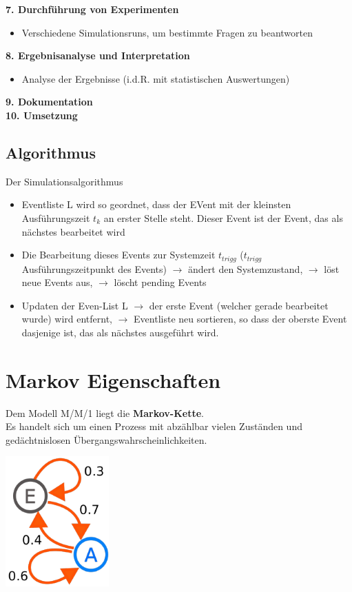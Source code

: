 \documentclass{report}
\newenvironment{Figure}
	{\par\medskip\noindent\minipage{\linewidth}}
	{\endminipage\par\medskip}
\theoremstyle{definition}
\theoremstyle{example}
\begin{document}
\textbf{7. Durchführung von Experimenten}
\begin{itemize}
   \item Verschiedene Simulationsruns, um bestimmte Fragen zu beantworten
\end{itemize}

\textbf{8. Ergebnisanalyse und Interpretation}
\begin{itemize}
   \item Analyse der Ergebnisse (i.d.R. mit statistischen Auswertungen)
\end{itemize}

\textbf{9. Dokumentation}\\
\textbf{10. Umsetzung}

   \subsection{Algorithmus}
Der Simulationsalgorithmus
\begin{itemize}
   \item Eventliste L wird so geordnet, dass der EVent mit der kleinsten Ausführungszeit $t_k$ an erster Stelle steht. Dieser Event ist der Event, das als nächstes bearbeitet wird
   \item Die Bearbeitung dieses Events zur Systemzeit $t_{trigg}$ ($t_{trigg}$ Ausführungszeitpunkt des Events) $\rightarrow$ ändert den Systemzustand, $\rightarrow$ löst neue Events aus, $\rightarrow$ löscht pending Events
   \item Updaten der Even-List L $\rightarrow$ der erste Event (welcher gerade bearbeitet wurde) wird entfernt, $\rightarrow$ Eventliste neu sortieren, so dass der oberste Event dasjenige ist, das als nächstes ausgeführt wird.
\end{itemize}

\section{Markov Eigenschaften}

Dem Modell M/M/1 liegt die \textbf{Markov-Kette}.\\
Es handelt sich um einen Prozess mit abzählbar vielen Zuständen und gedächtnislosen Übergangswahrscheinlichkeiten.

\begin{Figure}
\centering
\includegraphics[width=150px]{img/MM1.png}
	\label{fig:MM1 Modell}
\end{Figure}
\end{document}
